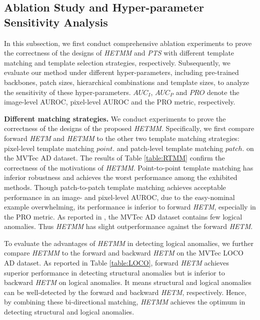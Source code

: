 \documentclass[default,iicol]{sn-jnl}\usepackage[algo2e,ruled,linesnumbered]{algorithm2e}
\theoremstyle{thmstyleone}\newtheorem{theorem}{Theorem}\newtheorem{proposition}[theorem]{Proposition}
\theoremstyle{thmstyletwo}\newtheorem{example}{Example}\newtheorem{remark}{Remark}
\theoremstyle{thmstylethree}\newtheorem{definition}{Definition}
\begin{document}
\subsection{Ablation Study and Hyper-parameter Sensitivity Analysis}
In this subsection, we first conduct comprehensive ablation experiments to prove the correctness of the designs of \textit{HETMM} and \textit{PTS} with different template matching and template selection strategies, respectively.
Subsequently, we evaluate our method under different hyper-parameters, including pre-trained backbones, patch sizes, hierarchical combinations and template sizes, to analyze the sensitivity of these hyper-parameters.
$AUC_{I}$, $AUC_{P}$ and $PRO$ denote the image-level AUROC, pixel-level AUROC and the PRO metric, respectively.

\noindent\textbf{Different matching strategies. }
We conduct experiments to prove the correctness of the designs of the proposed \textit{HETMM}.
Specifically, we first compare forward \textit{HETM} and \textit{HETMM} to the other two template matching strategies: pixel-level template matching $point.$ and patch-level template matching $patch.$ on the MVTec AD dataset.
The results of Table \ref{table:RTMM} confirm the correctness of the motivations of \textit{HETMM}.
Point-to-point template matching has inferior robustness and achieves the worst performance among the exhibited methods.
Though patch-to-patch template matching achieves acceptable performance in an image- and pixel-level AUROC, due to the easy-nominal example overwhelming, its performance is inferior to forward \textit{HETM}, especially in the PRO metric.
As reported in \cite{MVTECLOCO}, the MVTec AD dataset contains few logical anomalies. Thus \textit{HETMM} has slight outperformance against the forward \textit{HETM}.

To evaluate the advantages of \textit{HETMM} in detecting logical anomalies, we further compare \textit{HETMM} to the forward and backward \textit{HETM} on the MVTec LOCO AD dataset.
As reported in Table \ref{table:LOCO}, forward \textit{HETM} achieves superior performance in detecting structural anomalies but is inferior to backward \textit{HETM} on logical anomalies.
It means structural and logical anomalies can be well-detected by the forward and backward \textit{HETM}, respectively.
Hence, by combining these bi-directional matching, \textit{HETMM} achieves the optimum in detecting structural and logical anomalies.
\end{document}
